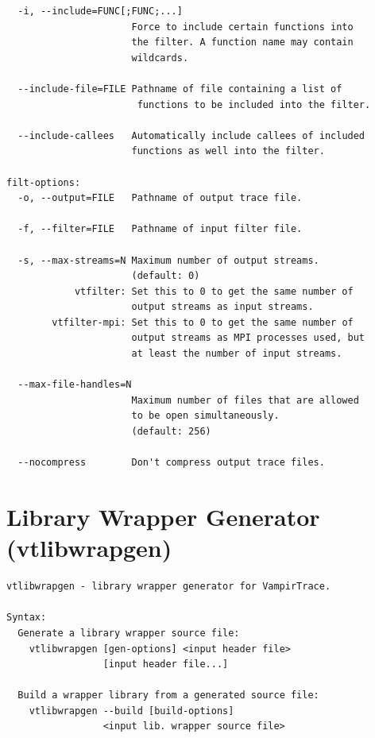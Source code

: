 \documentclass[a4paper,twoside,12pt,BCOR12mm]{scrbook}
\begin{document}
\begin{latexonly}
\begin{verbatim}
  -i, --include=FUNC[;FUNC;...]
                      Force to include certain functions into
                      the filter. A function name may contain
                      wildcards.             

  --include-file=FILE Pathname of file containing a list of
                       functions to be included into the filter.                            

  --include-callees   Automatically include callees of included
                      functions as well into the filter.                           

filt-options:
  -o, --output=FILE   Pathname of output trace file.

  -f, --filter=FILE   Pathname of input filter file.

  -s, --max-streams=N Maximum number of output streams.
                      (default: 0)
            vtfilter: Set this to 0 to get the same number of
                      output streams as input streams.                                     
        vtfilter-mpi: Set this to 0 to get the same number of
                      output streams as MPI processes used, but
                      at least the number of input streams.

  --max-file-handles=N
                      Maximum number of files that are allowed
                      to be open simultaneously.
                      (default: 256)

  --nocompress        Don't compress output trace files.
\end{verbatim}
\latex{\end{small}}

\latex{\newpage}  %

\section{Library Wrapper Generator (vtlibwrapgen)}
\label{sec:VTLIBWRAPGEN}

\latex{\begin{small}}
\begin{verbatim}
vtlibwrapgen - library wrapper generator for VampirTrace.

Syntax: 
  Generate a library wrapper source file:
    vtlibwrapgen [gen-options] <input header file> 
                 [input header file...]

  Build a wrapper library from a generated source file:
    vtlibwrapgen --build [build-options] 
                 <input lib. wrapper source file>


\end{verbatim}
\end{latexonly}
\end{document}
